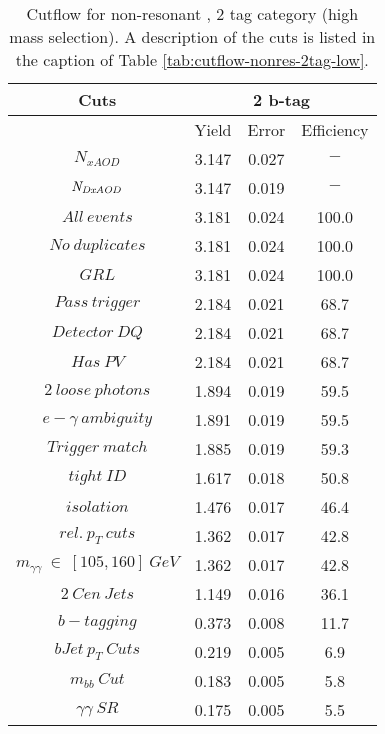 \begin{table}\footnotesize
\begin{center}
\caption{Cutflow for non-resonant \hhyybb, 2 tag category (high mass selection). A description of the cuts is listed in the caption of Table \ref{tab:cutflow-nonres-2tag-low}.}
\label{tab:cutflow-nonres-2tag-high}
\begin{tabular}{|c|c|c|c|}
 \hline
Cuts& \multicolumn{3}{c|}{2 b-tag} \\ \hline
 &Yield&Error&Efficiency\\ \hline
$N_{xAOD}$ & 3.147&0.027 &$-$ \\
 \hline
$\it{N}_{DxAOD}$ & 3.147&0.019 &$-$ \\
 \hline
$All\ events$ & 3.181&0.024 &100.0 \\
 \hline
$No\ duplicates$ & 3.181&0.024 &100.0 \\
 \hline
$GRL$ & 3.181&0.024 &100.0 \\
 \hline
$Pass\ trigger$ & 2.184&0.021 &68.7 \\
 \hline
$Detector\ DQ$ & 2.184&0.021 &68.7 \\
 \hline
$Has\ PV$ & 2.184&0.021 &68.7 \\
 \hline
$2\ loose\ photons$ & 1.894&0.019 &59.5 \\
 \hline
$e-\gamma\ ambiguity$ & 1.891&0.019 &59.5 \\
 \hline
$Trigger\ match$ & 1.885&0.019 &59.3 \\
 \hline
$tight\ ID$ & 1.617&0.018 &50.8 \\
 \hline
$isolation$ & 1.476&0.017 &46.4 \\
 \hline
$rel.\ p_{T}\ cuts$ & 1.362&0.017 &42.8 \\
 \hline
$m_{\gamma\gamma}\ \in\ [105,160]\ GeV$ & 1.362&0.017 &42.8 \\
 \hline
$2\ Cen\ Jets$ & 1.149&0.016 &36.1 \\
 \hline
$b-tagging$ & 0.373&0.008 &11.7 \\
 \hline
$bJet\ p_{T}\ Cuts$ & 0.219&0.005 & 6.9 \\
 \hline
$m_{bb}\ Cut$ & 0.183&0.005 & 5.8 \\
 \hline
$\gamma\gamma\ SR$ & 0.175&0.005 & 5.5 \\
 \hline
\end{tabular}
\end{center}
\end{table}
